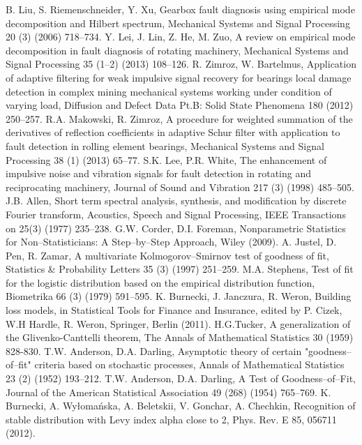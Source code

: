 \documentclass[3p,times]{elsarticle}
\begin{document}
\begin{thebibliography}{00}
 B. Liu, S. Riemenschneider, Y. Xu, Gearbox fault diagnosis using empirical mode decomposition and Hilbert spectrum, Mechanical Systems and Signal Processing 20 (3) (2006) 718--734.
 Y. Lei, J. Lin, Z. He, M. Zuo, A review on empirical mode decomposition in fault diagnosis of rotating machinery, Mechanical Systems and Signal Processing 35 (1--2) (2013) 108--126.
 R. Zimroz, W. Bartelmus, Application of adaptive filtering for weak impulsive signal recovery for bearings local damage detection in complex mining mechanical systems working under condition of varying load, Diffusion and Defect Data Pt.B: Solid State Phenomena 180 (2012) 250--257.
 R.A. Makowski, R. Zimroz, A procedure for weighted summation of the derivatives of reflection coefficients in adaptive Schur filter with application to fault detection in rolling element bearings, Mechanical Systems and Signal Processing 38 (1) (2013) 65--77.
 S.K. Lee, P.R. White, The enhancement of impulsive noise and vibration signals for fault detection in rotating and reciprocating machinery, Journal of Sound and Vibration 217 (3) (1998) 485--505.
 J.B. Allen, Short term spectral analysis, synthesis, and modification by discrete Fourier transform, Acoustics, Speech and Signal Processing, IEEE Transactions on 25(3) (1977) 235--238.
 G.W. Corder, D.I. Foreman, Nonparametric Statistics for Non--Statisticians: A Step--by--Step Approach, Wiley (2009).
 A. Justel, D. Pen, R. Zamar, A multivariate Kolmogorov--Smirnov test of goodness of fit, Statistics \& Probability Letters 35 (3) (1997) 251--259.
 M.A. Stephens, Test of fit for the logistic distribution based on the empirical distribution function, Biometrika 66 (3) (1979) 591--595.
 K. Burnecki, J. Janczura, R. Weron, Building loss models, in Statistical Tools for Finance and Insurance, edited by P. Cizek, W.H Hardle, R. Weron, Springer, Berlin (2011).
H.G.Tucker, A generalization of the Glivenko-Canttelli theorem, The Annals of Mathematical Statistics 30 (1959) 828-830.
 T.W. Anderson, D.A. Darling, Asymptotic theory of certain "goodness--of--fit" criteria based on stochastic processes, Annals of Mathematical Statistics 23 (2) (1952) 193--212.
 T.W. Anderson, D.A. Darling, A Test of Goodness--of--Fit, Journal of the American Statistical Association 49 (268) (1954) 765--769.
 K. Burnecki, A. Wy{\l}oma{\'n}ska, A. Beletskii, V. Gonchar, A. Chechkin, Recognition of stable distribution with Levy index alpha close to 2, Phys. Rev. E 85, 056711 (2012).

\end{thebibliography}
\end{document}
